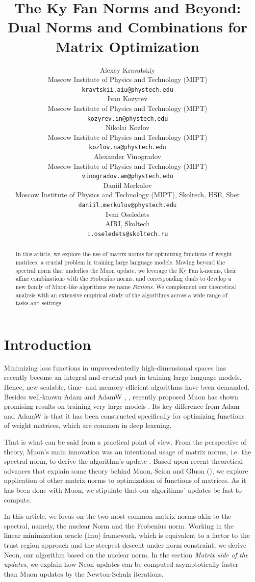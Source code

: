 \documentclass{article} %
\title{The Ky Fan Norms and Beyond: Dual Norms and Combinations for Matrix Optimization}
\author{Alexey Kravatskiy \\
Moscow Institute of Physics and Technology (MIPT) \\
\texttt{kravtskii.aiu@phystech.edu} \\
\And
Ivan Kozyrev \\
Moscow Institute of Physics and Technology (MIPT) \\
\texttt{kozyrev.in@phystech.edu} \\
\And
Nikolai Kozlov \\
Moscow Institute of Physics and Technology (MIPT) \\
\texttt{kozlov.na@phystech.edu} \\
\And
Alexander Vinogradov \\
Moscow Institute of Physics and Technology (MIPT) \\
\texttt{vinogradov.am@phystech.edu} \\
\And
Daniil Merkulov \\
Moscow Institute of Physics and Technology (MIPT), Skoltech, HSE, Sber \\
\texttt{daniil.merkulov@phystech.edu} \\
\And
Ivan Oseledets \\
AIRI, Skoltech \\
\texttt{i.oseledets@skoltech.ru}
}
\begin{document}
\maketitle

\begin{abstract}
In this article, we explore the use of matrix norms for optimizing functions of weight matrices, a crucial problem in training large language models. Moving beyond the spectral norm that underlies the Muon update, we leverage the Ky Fan k-norms, their affine combinations with the Frobenius norms, and corresponding duals to develop a new family of Muon-like algorithms we name {\it Fanions}. We complement our theoretical analysis with an extensive empirical study of the algorithms across a wide range of tasks and settings.
\end{abstract}

\section{Introduction}
 Minimizing loss functions in unprecedentedly high-dimensional spaces has recently become an integral and crucial part in training large language models. Hence, new scalable, time- and memory-efficient algorithms have been demanded. Besides well-known Adam and AdamW \cite{kingma2014adam}, \cite{loshchilov2017decoupled}, recently proposed Muon has shown promising results on training very large models \cite{jordan2024muon,liu2025muon}. Its key difference from Adam and AdamW is that it has been constructed specifically for optimizing functions of weight matrices, which are common in deep learning.
 
 That is what can be said from a practical point of view. From the perspective of theory, Muon's main innovation was an intentional usage of matrix norms, i.e. the spectral norm, to derive the algorithm's update \cite{bernstein2025deriving}. Based upon recent theoretical advances that explain some theory behind Muon, Scion and Gluon (\cite{bernstein2025deriving,kovalev2025understanding,pethick2025training,riabinin2025gluon}), we explore application of other matrix norms to optimization of functions of matrices. As it has been done with Muon, we stipulate that our algorithms' updates be fast to compute.

 In this article, we focus on the two most common matrix norms akin to the spectral, namely, the nuclear Norm and the Frobenius norm. Working in the linear minimization oracle (lmo) framework, which is equivalent to a factor to the trust region approach and the steepest descent under norm constraint, we derive Neon, our algorithm based on the nuclear norm. In the section {\it Matrix side of the updates}, we explain how Neon updates can be computed asymptotically faster than Muon updates by the Newton-Schulz iterations.
\end{document}
